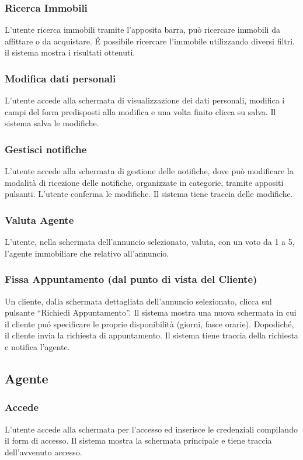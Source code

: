 \subsubsection{Ricerca Immobili}
L'utente ricerca immobili tramite l'apposita barra, può ricercare 
immobili da affittare o da acquistare. É possibile ricercare 
l'immobile utilizzando diversi filtri. il sistema mostra i risultati ottenuti.

\subsubsection{Modifica dati personali}
L'utente accede alla schermata di visualizzazione dei dati personali, modifica 
i campi del form predisposti alla modifica e una volta finito clicca su salva. 
Il sistema salva le modifiche.

\subsubsection{Gestisci notifiche}
L'utente accede alla schermata di gestione delle notifiche, dove
può modificare la modalità di ricezione delle notifiche, organizzate 
in categorie, tramite appositi pulsanti. L'utente conferma le modifiche. 
Il sistema tiene traccia delle modifiche.

\subsubsection{Valuta Agente}
L'utente, nella schermata dell'annuncio selezionato, valuta, con un voto da 1 
a 5, l'agente immobiliare che relativo all'annuncio.

\subsubsection{Fissa Appuntamento (dal punto di vista del Cliente)}
Un cliente, dalla schermata dettagliata dell'annuncio selezionato, clicca sul 
pulsante “Richiedi Appuntamento”. Il sistema mostra una nuova schermata in cui il 
cliente puó specificare le proprie disponibilità (giorni, fasce orarie). 
Dopodiché, il cliente invia la richiesta di appuntamento. Il sistema tiene
traccia della richiesta e notifica l'agente.

\subsection{Agente}
\subsubsection{Accede}
L'utente accede alla schermata per l'accesso ed inserisce le credenziali 
compilando il form di accesso. Il sistema mostra la schermata principale 
e tiene traccia dell'avvenuto accesso.

